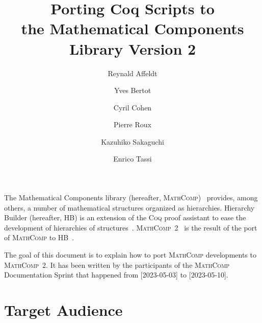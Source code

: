 \documentclass{article}
\title{Porting Coq Scripts to \\ the Mathematical Components Library Version 2}
\author{Reynald Affeldt \and Yves Bertot \and Cyril Cohen \and Pierre Roux \and Kazuhiko Sakaguchi \and Enrico Tassi}
\def\coq{\textsc{Coq}}
\def\mathcomp{\textsc{MathComp}}
\def\mathcomptwo{\mathcomp~2}
\def\hb{\textsc{HB}}
\begin{document}
\maketitle

The Mathematical Components library (hereafter, \mathcomp{})~\cite{mathcompbook} provides,
among others, a number of mathematical structures organized as
hierarchies. Hierarchy Builder (hereafter, \hb) is an extension of the
\coq{} proof assistant to ease the development of hierarchies of
structures~\cite{cohen2020fscd}. \mathcomptwo{}~\cite{mathcomp2} is the result of the
port of \mathcomp{} to \hb{}~\cite{mathcomp2021coq}.

The goal of this document is to explain how to port \mathcomp{}
developments to \mathcomptwo.  It has been written by the participants
of the \mathcomp{} Documentation Sprint that happened from
[2023-05-03] to [2023-05-10].

\tableofcontents

\section{Target Audience}
\end{document}
